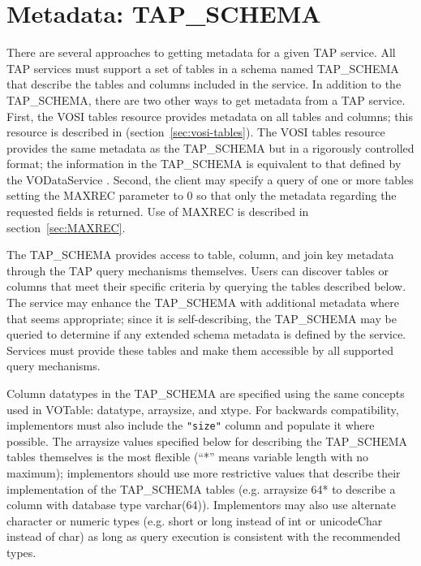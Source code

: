 \documentclass[11pt,letter]{ivoa}
\newcommand{\tapschema}{TAP\_SCHEMA}
\newcommand{\tapschema}{{%
  \relsize{-0.5}TAP\discretionary{-}{}{\kern-2pt\_}SCHEMA}}
\begin{document}
\section{Metadata: TAP\kern-3pt\_SCHEMA}
\label{sec:tap-schema}

There are several approaches to getting metadata for a given TAP service. All 
TAP services must support a set of tables in a schema named 
\tapschema{} that describe the tables and columns included in the 
service. In addition to the \tapschema, there are two other ways 
to get metadata from a TAP service. First, the VOSI tables resource provides 
metadata on all tables and columns; this resource is described in 
(section~\ref{sec:vosi-tables}). The 
VOSI tables resource provides the same metadata as the \tapschema{}
but in a rigorously controlled format; the information in the 
\tapschema{} is equivalent to that defined by the  VODataService 
\citep{std:VODS11}. Second, the client may specify a query of one or more 
tables setting the 
MAXREC parameter to 0 so that only the metadata regarding the requested fields 
is returned. Use of MAXREC is described in section~\ref{sec:MAXREC}.

The \tapschema{} provides access to table, column, and join key 
metadata through the TAP query mechanisms themselves. Users can discover tables 
or columns that meet their specific criteria by querying the tables described 
below.  The service may enhance the \tapschema{} with additional 
metadata where that seems appropriate; since it is self-describing, the 
\tapschema{} may be queried to determine if any extended schema 
metadata is defined by the service. Services must provide these tables and make 
them accessible by all supported query mechanisms.

Column datatypes in the \tapschema{} are specified using the same concepts used in 
VOTable: datatype, arraysize, and xtype. For backwards compatibility, implementors
must also include the \verb|"size"| column and populate it where possible. The arraysize values
specified below for describing the \tapschema{} tables themselves is the most flexible 
(``*'' means variable length with no maximum); implementors should use more restrictive values
that describe their implementation of the \tapschema{} tables (e.g. arraysize 64* to describe
a column with database type varchar(64)). Implementors may also use alternate character or numeric types (e.g. short or long instead of int or unicodeChar instead of char) as long as
query execution is consistent with the recommended types.
\end{document}

